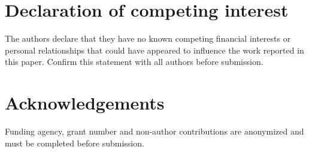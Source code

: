 \documentclass[preprint,12pt]{elsarticle}
\begin{document}
\section*{Declaration of competing interest}
The authors declare that they have no known competing financial interests or personal relationships that could have appeared to influence the work reported in this paper. Confirm this statement with all authors before submission.

\section*{Acknowledgements}
Funding agency, grant number and non-author contributions are anonymized and must be completed before submission.



\end{document}
